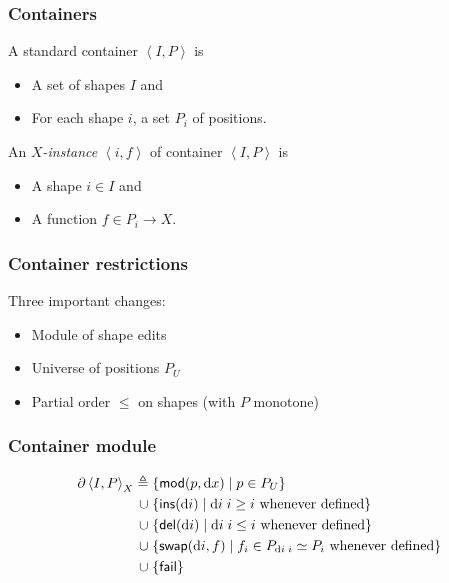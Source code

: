 \documentclass{beamer}
\begin{document}
\begin{frame}
    \frametitle{Containers}
    A standard container $\left<I,P\right>$ is
    \begin{itemize}
        \item A set of shapes $I$ and
        \item For each shape $i$, a set $P_i$ of positions.
    \end{itemize}
    An \emph{$X$-instance} $\left<i,f\right>$ of container $\left<I,P\right>$ is
    \begin{itemize}
        \item A shape $i \in I$ and
        \item A function $f \in P_i \to X$.
    \end{itemize}
\end{frame}

\begin{frame}
    \frametitle{Container restrictions}
    Three important changes:

    \begin{itemize}
        \item Module of shape edits
        \item Universe of positions $P_U$
        \item Partial order $\le$ on shapes (with $P$ monotone)
    \end{itemize}
\end{frame}


\begin{frame}
    \frametitle{Container module}
    \begin{align*}
        \partial\left<I,P\right>_X
            \triangleq{}&
                \{\mathsf{mod}(p,\textrm{d} x) \mid p \in P_U\}
            \\ \mathrel{\cup}{}&
                \{\mathsf{ins}(\textrm{d} i) \mid \textrm{d} i\;i \ge i\mbox{ whenever defined}\}
            \\ \mathrel{\cup}{}&
                \{\mathsf{del}(\textrm{d} i) \mid \textrm{d} i\;i \le i\mbox{ whenever defined}\}
            \\ \mathrel{\cup}{}&
                \{\mathsf{swap}(\textrm{d} i,f) \mid f_i \in P_{\textrm{d} i\;i} \simeq P_i
                \mbox{ whenever defined} \}
            \\ \mathrel{\cup}{}&
                \{\mathsf{fail}\}
    \end{align*}
\end{frame}
\end{document}
